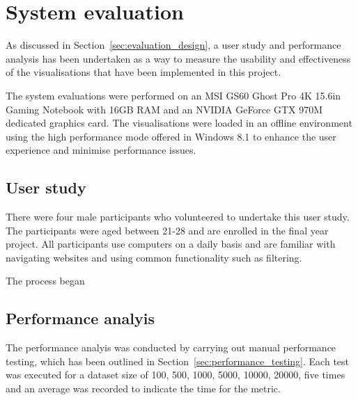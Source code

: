 \section{System evaluation} {
\label{sec:system_evaluation}



	As discussed in Section~\ref{sec:evaluation_design}, a user study and performance analysis has been undertaken as a way to measure the usability and effectiveness of the visualisations that have been implemented in this project.

	The system evaluations were performed on an MSI GS60 Ghost Pro 4K 15.6in Gaming Notebook with 16GB RAM and an NVIDIA GeForce GTX 970M dedicated graphics card. The visualisations were loaded in an offline environment using the high performance mode offered in Windows 8.1 to enhance the user experience and minimise performance issues.

	\subsection{User study} {
	\label{user_study}


		There were four male participants who volunteered to undertake this user study. The participants were aged between 21-28 and are enrolled in the final year project. All participants use computers on a daily basis and are familiar with navigating websites and using common functionality such as filtering.

		The process began 

	}

	\subsection{Performance analyis} {
	\label{sec:performance_analysis}

		The performance analyis was conducted by carrying out manual performance testing, which has been outlined in Section~\ref{sec:performance_testing}. Each test was executed for a dataset size of 100, 500, 1000, 5000, 10000, 20000, five times and an average was recorded to indicate the time for the metric.

	}


}
